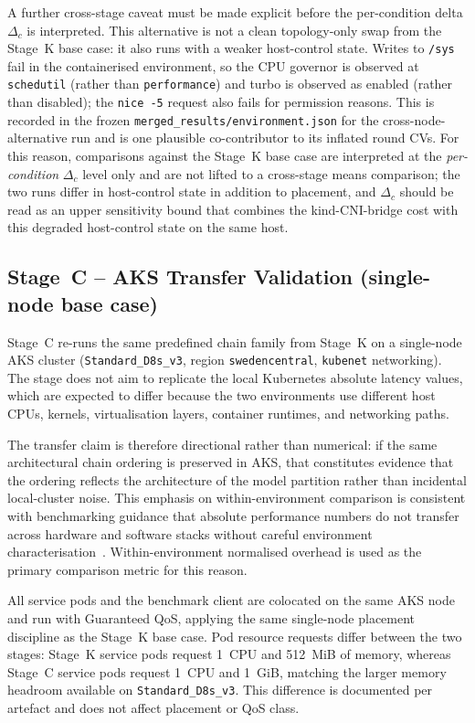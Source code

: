 A further cross-stage caveat must be made explicit before the per-condition delta
$\Delta_c$ is interpreted. This alternative is not a clean topology-only swap from the
Stage~K base case: it also runs with a weaker host-control state. Writes to \texttt{/sys}
fail in the containerised environment, so the CPU governor is observed at \texttt{schedutil}
(rather than \texttt{performance}) and turbo is observed as enabled (rather than disabled); the
\texttt{nice~-5} request also fails for permission reasons. This is recorded in the frozen
\texttt{merged\_results/environment.json} for the cross-node-alternative run and is one
plausible co-contributor to its inflated round CVs. For this reason, comparisons against the
Stage~K base case are interpreted at the \emph{per-condition} $\Delta_c$ level only and are
not lifted to a cross-stage means comparison; the two runs differ in host-control state in
addition to placement, and $\Delta_c$ should be read as an upper sensitivity bound that
combines the kind-CNI-bridge cost with this degraded host-control state on the same host.

\subsection{Stage~C -- AKS Transfer Validation (single-node base case)}
\label{sec:methods-rq15}

Stage~C re-runs the same predefined chain family from Stage~K on a single-node AKS cluster
(\texttt{Standard\_D8s\_v3}, region \texttt{swedencentral}, \texttt{kubenet}
networking).
The stage does not aim to replicate the local Kubernetes absolute latency values, which
are expected to differ because the two environments use different host CPUs, kernels,
virtualisation layers, container runtimes, and networking paths.

The transfer claim is therefore directional rather than numerical: if the same
architectural chain ordering is preserved in AKS, that constitutes evidence that the
ordering reflects the architecture of the model partition rather than incidental
local-cluster noise. This emphasis on within-environment comparison is consistent with
benchmarking guidance that absolute performance numbers do not transfer across hardware
and software stacks without careful environment characterisation~\cite{benchmarking_sc15}.
Within-environment normalised overhead is used as the primary comparison metric for
this reason.

All service pods and the benchmark client are colocated on the same AKS node and run
with Guaranteed QoS, applying the same single-node placement discipline as the Stage~K
base case. Pod resource requests differ between the two stages: Stage~K service pods
request 1~CPU and 512~MiB of memory, whereas Stage~C service pods request 1~CPU and 1~GiB,
matching the larger memory headroom available on \texttt{Standard\_D8s\_v3}. This difference
is documented per artefact and does not affect placement or QoS class.

